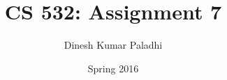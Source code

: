 \documentclass[letterpaper]{report}
\begin{document}
\newpage
\renewcommand{\thesection}{\arabic{section}}

\author{Dinesh Kumar Paladhi}
\title{CS 532: Assignment 7}

\date{Spring 2016}
\maketitle

\tableofcontents
\newpage









\nocite {*} 
\end{document}
